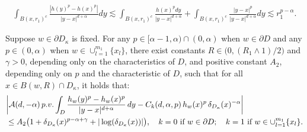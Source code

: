 \documentclass[10pt,a4paper]{amsart}
\newcommand{\ga}{\gamma}
\begin{document}
\begin{align}\label{non-singular argument}
\int_{B(x,r_1)^c}\frac{|h(y)^p - h(x)^p|}{|y-x|^{d+\alpha}}dy \lesssim  \int_{B(x,r_1)^c} \frac{h(x)^p dy}{|y-x|^{d+\alpha}} + \int_{B(x,r_1)^c}\frac{|y-x|^p}{|y-x|^{d+\alpha}}dy\lesssim r_1^{p-\alpha}.
\end{align}

\begin{prop} \label{perturbation: general case}
Suppose $w \in \partial D_\kappa$ is fixed. For any $p \in [\alpha - 1, \alpha) \cap (0, \alpha)$ when $w\in \partial D$ and  any $p \in (0, \alpha)$ when $w\in \cup_{l=1}^{m_1}\{x_l\}$, there exist constants $R \in \big(0, (R_1 \wedge 1)/2\big)$ and $\ga>0$, 
depending only on the characteristics of $D$,
and positive constant $A_2$, depending only on $p$ and the characteristic of $D$, such that for all $x \in B(w, R) \cap D_\kappa$, it holds that:
\begin{equation}
\begin{aligned}
& \bigg| \mathcal{A}(d, -\alpha) \, {\rm p.v.} 
\int_{D}
\frac{h_w(y)^{p} - h_w(x)^{p}}{|y-x|^{d+\alpha}} \, dy 
- C_k(d, \alpha, p) \, h_w(x)^p \, \delta_{D_\kappa}(x)^{- \alpha} \bigg| \\
& \leq A_2 \big(1 + \delta_{D_\kappa}(x)^{p-\alpha+\gamma} + |\log(\delta_{D_\kappa}(x))| \big), 
\quad k=0 \ 
\text{if} \ w \in \partial D; \quad k=1 \ \text{if} \ w \in \cup_{l=1}^{m_1}\{x_l\}.
\end{aligned}
\end{equation}
\end{prop}
\end{document}
